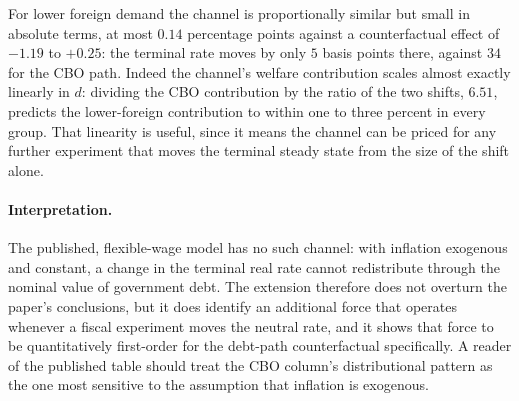 For lower foreign demand the channel is proportionally similar but small in
absolute terms, at most $0.14$ percentage points against a counterfactual effect
of $-1.19$ to $+0.25$: the terminal rate moves by only $5$ basis points there,
against $34$ for the CBO path. Indeed the channel's welfare contribution scales
almost exactly linearly in $d$: dividing the CBO contribution by the ratio of
the two shifts, $6.51$, predicts the lower-foreign contribution to within one to
three percent in every group. That linearity is useful, since it means the
channel can be priced for any further experiment that moves the terminal steady
state from the size of the shift alone.

\paragraph{Interpretation.} The published, flexible-wage model has no such
channel: with inflation exogenous and constant, a change in the terminal real
rate cannot redistribute through the nominal value of government debt. The
extension therefore does not overturn the paper's conclusions, but it does
identify an additional force that operates whenever a fiscal experiment moves
the neutral rate, and it shows that force to be quantitatively first-order for
the debt-path counterfactual specifically. A reader of the published table
should treat the CBO column's distributional pattern as the one most sensitive
to the assumption that inflation is exogenous.


